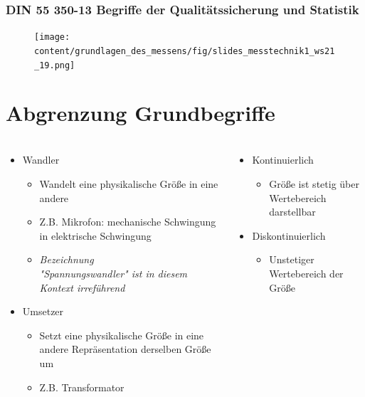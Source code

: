 \begin{frame}
    \frametitle{DIN 55 350-13 Begriffe der Qualitätssicherung und Statistik }
    \begin{figure}
        \texttt{[image: content/grundlagen\_des\_messens/fig/slides\_messtechnik1\_ws21\_19.png]}
    \end{figure}
\end{frame}

\section{Abgrenzung Grundbegriffe}

\begin{frame}
    \frametitle{\insertsection}
    \begin{columns}[onlytextwidth]
       \begin{column}{0.5\textwidth}
           \begin{itemize}
               \item Wandler
               \begin{itemize}
                   \item Wandelt eine physikalische Größe in eine andere
                   \item Z.B. Mikrofon: mechanische Schwingung in elektrische Schwingung
                   \item \textsl{Bezeichnung\\"Spannungswandler" ist in diesem Kontext irreführend}
               \end{itemize}
               \item Umsetzer
               \begin{itemize}
                   \item Setzt eine physikalische Größe in eine andere Repräsentation derselben Größe um
                   \item Z.B. Transformator
               \end{itemize}
           \end{itemize}
       \end{column}
       \begin{column}{0.5\textwidth}
        \begin{itemize}
            \item Kontinuierlich
            \begin{itemize}
                \item Größe ist stetig über Wertebereich darstellbar
            \end{itemize}
            \item Diskontinuierlich
            \begin{itemize}
                \item Unstetiger Wertebereich der Größe
            \end{itemize}
        \end{itemize}
    \end{column}
    \end{columns}
\end{frame}

